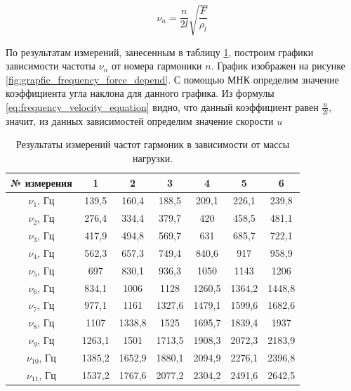 \documentclass[12pt,a4paper]{article}
\begin{document}
\begin{equation}
	\nu_{n} = \frac{n}{2l} \sqrt{\frac{F}{\rho_{l}}}
	\label{eq:velocity_force_equation}
\end{equation}

По результатам измерений, занесенным в таблицу \ref{tab:measuring_results}, построим графики зависимости частоты $\nu_{n}$ от номера гармоники $n$. График изображен на рисунке \ref{fig:grapfic_frequency_force_depend}. С помощью МНК определим значение коэффициента угла наклона для данного графика. Из формулы \ref{eq:frequency_velocity_equation} видно, что данный коэффициент равен $\frac{u}{2l}$, значит, из данных зависимостей определим значение скорости $u$

\begin{table}[h!]
\centering
\begin{tabular}{|c|c|c|c|c|c|c|}
\hline
№ измерения & 1        & 2        & 3        & 4        & 5        & 6        \\ \hline
$\nu_{1}$, Гц      & 139,5    & 160,4    & 188,5    & 209,1    & 226,1    & 239,8    \\ \hline
$\nu_{2}$, Гц      & 276,4    & 334,4    & 379,7    & 420      & 458,5    & 481,1    \\ \hline
$\nu_{3}$, Гц      & 417,9    & 494,8    & 569,7    & 631      & 685,7    & 722,1    \\ \hline
$\nu_{4}$, Гц      & 562,3    & 657,3    & 749,4    & 840,6    & 917      & 958,9    \\ \hline
$\nu_{5}$, Гц      & 697      & 830,1    & 936,3    & 1050     & 1143     & 1206     \\ \hline
$\nu_{6}$, Гц      & 834,1    & 1006     & 1128     & 1260,5   & 1364,2   & 1448,8   \\ \hline
$\nu_{7}$, Гц      & 977,1    & 1161     & 1327,6   & 1479,1   & 1599,6   & 1682,6   \\ \hline
$\nu_{8}$, Гц      & 1107     & 1338,8  & 1525  & 1695,7 & 1839,4 & 1937 \\ \hline
$\nu_{9}$, Гц      & 1263,1   & 1501 & 1713,5 & 1908,3 & 2072,3 & 2183,9 \\ \hline
$\nu_{10}$, Гц     & 1385,2 & 1652,9 & 1880,1 & 2094,9 & 2276,1  & 2396,8 \\ \hline
$\nu_{11}$, Гц     & 1537,2  & 1767,6 & 2077,2  & 2304,2 & 2491,6 & 2642,5 \\ \hline
\end{tabular}
\caption{Результаты измерений частот гармоник в зависимости от массы нагрузки.}
\label{tab:measuring_results}
\end{table}
\end{document}
